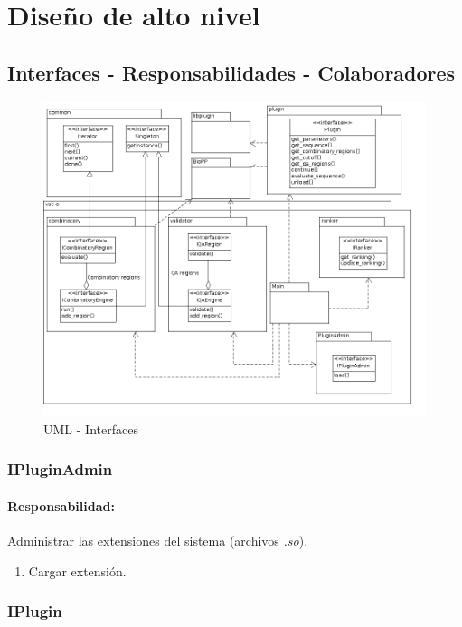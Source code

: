 \section{Dise\~no de alto nivel}
\subsection{Interfaces - Responsabilidades - Colaboradores}
\begin{figure}
  \centering
  \includegraphics[scale=0.5, angle=90]{hld.png}  
  \caption{UML - Interfaces}
  \label{uml:1}
\end{figure}

  \subsubsection{IPluginAdmin}
    \paragraph{Responsabilidad:} Administrar las extensiones del sistema
(archivos \textit{.so}).    
      \begin{enumerate}
       \item Cargar extensi\'on.       
      \end{enumerate}    

  \subsubsection{IPlugin}
